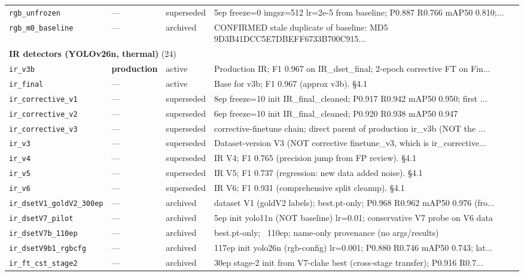 \begin{longtable}{p{}llp{}}
\texttt{rgb\_unfrozen} & --- & superseded & 5ep freeze=0 imgsz=512 lr=2e-5 from baseline; P0.887 R0.766 mAP50 0.810;... \\
\texttt{rgb\_m0\_baseline} & --- & archived & CONFIRMED stale duplicate of baseline: MD5 9D3B41DCC5E7DBEFF6733B700C915... \\
\midrule
\multicolumn{4}{l}{\textbf{IR detectors (YOLOv26n, thermal)} (24)} \\
\midrule
\texttt{ir\_v3b} & \textbf{production} & active & Production IR; F1 0.967 on IR\_dset\_final; 2-epoch corrective FT on Fin... \\
\texttt{ir\_final} & --- & active & Base for v3b; F1 0.967 (approx v3b). §4.1 \\
\texttt{ir\_corrective\_v1} & --- & superseded & 8ep freeze=10 init IR\_final\_cleaned; P0.917 R0.942 mAP50 0.950; first ... \\
\texttt{ir\_corrective\_v2} & --- & superseded & 6ep freeze=10 init IR\_final\_cleaned; P0.920 R0.938 mAP50 0.947 \\
\texttt{ir\_corrective\_v3} & --- & superseded & corrective-finetune chain; direct parent of production ir\_v3b (NOT the ... \\
\texttt{ir\_v3} & --- & superseded & Dataset-version V3 (NOT corrective finetune\_v3, which is ir\_corrective... \\
\texttt{ir\_v4} & --- & superseded & IR V4; F1 0.765 (precision jump from FP review). §4.1 \\
\texttt{ir\_v5} & --- & superseded & IR V5; F1 0.737 (regression: new data added noise). §4.1 \\
\texttt{ir\_v6} & --- & superseded & IR V6; F1 0.931 (comprehensive split cleanup). §4.1 \\
\texttt{ir\_dsetV1\_goldV2\_300ep} & --- & archived & dataset V1 (goldV2 labels); best.pt-only; P0.968 R0.962 mAP50 0.976 (fro... \\
\texttt{ir\_dsetV7\_pilot} & --- & archived & 5ep init yolo11n (NOT baseline) lr=0.01; conservative V7 probe on V6 data \\
\texttt{ir\_dsetV7b\_110ep} & --- & archived & best.pt-only; ~110ep; name-only provenance (no args/results) \\
\texttt{ir\_dsetV9b1\_rgbcfg} & --- & archived & 117ep init yolo26n (rgb-config) lr=0.001; P0.880 R0.746 mAP50 0.743; lat... \\
\texttt{ir\_ft\_cst\_stage2} & --- & archived & 30ep stage-2 init from V7-clahe best (cross-stage transfer); P0.916 R0.7... \\

\end{longtable}
